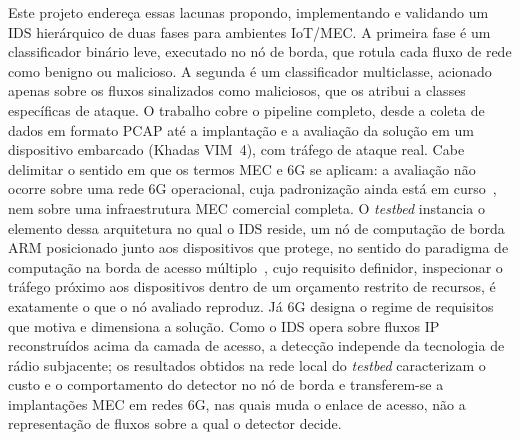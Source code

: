 \documentclass[12pt,a4paper]{article}
\begin{document}
Este projeto endereça essas lacunas propondo, implementando e validando um IDS
hierárquico de duas fases para ambientes IoT/MEC. A primeira fase é um
classificador binário leve, executado no nó de borda, que rotula cada fluxo de
rede como benigno ou malicioso. A segunda é um classificador multiclasse,
acionado apenas sobre os fluxos sinalizados como maliciosos, que os atribui a
classes específicas de ataque. O trabalho cobre o pipeline completo, desde a
coleta de dados em formato PCAP até a implantação e a avaliação da solução em
um dispositivo embarcado (Khadas VIM~4), com tráfego de ataque real. Cabe
delimitar o sentido em que os termos MEC e 6G se aplicam: a avaliação não
ocorre sobre uma rede 6G operacional, cuja padronização ainda está em
curso~\cite{you:21}, nem sobre uma infraestrutura MEC comercial completa. O
\textit{testbed} instancia o elemento dessa arquitetura no qual o IDS reside,
um nó de computação de borda ARM posicionado junto aos dispositivos que
protege, no sentido do paradigma de computação na borda de acesso
múltiplo~\cite{gyamfi:22}, cujo requisito definidor, inspecionar o tráfego
próximo aos dispositivos dentro de um orçamento restrito de recursos, é
exatamente o que o nó avaliado reproduz. Já 6G designa o regime de requisitos
que motiva e dimensiona a solução. Como o IDS opera sobre fluxos IP
reconstruídos acima da camada de acesso, a detecção independe da tecnologia de
rádio subjacente; os resultados obtidos na rede local do \textit{testbed}
caracterizam o custo e o comportamento do detector no nó de borda e
transferem-se a implantações MEC em redes 6G, nas quais muda o enlace de
acesso, não a representação de fluxos sobre a qual o detector decide.
\end{document}
